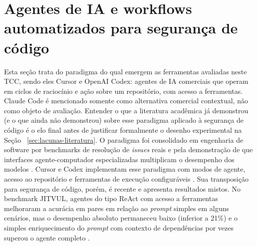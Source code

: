 \section{Agentes de IA e workflows automatizados para segurança de código}\label{sec:agentes-ia-seguranca}
Esta seção trata do paradigma do qual emergem as ferramentas avaliadas neste TCC, sendo eles Cursor e OpenAI Codex: agentes de IA comerciais que operam em ciclos de raciocínio e ação sobre um repositório, com acesso a ferramentas. Claude Code é mencionado somente como alternativa comercial contextual, não como objeto de avaliação. Entender o que a literatura acadêmica já demonstrou (e o que ainda não demonstrou) sobre esse paradigma aplicado à segurança de código é o elo final antes de justificar formalmente o desenho experimental na Seção ~\ref{sec:lacunas-literatura}. O paradigma foi consolidado em engenharia de software por benchmarks de resolução de \textit{issues} reais \cite{Jimenez2024SWEbench} e pela demonstração de que interfaces agente-computador especializadas multiplicam o desempenho dos modelos \cite{Yang2024SWEagent}. Cursor e Codex implementam esse paradigma com modos de agente, acesso ao repositório e ferramentas de execução configuráveis \cite{Cursor2025Docs, OpenAI2025CodexDocs}. Sua transposição para segurança de código, porém, é recente e apresenta resultados mistos. No benchmark JITVUL, agentes do tipo ReAct com acesso a ferramentas melhoraram a acurácia em pares em relação ao \textit{prompt} simples em alguns cenários, mas o desempenho absoluto permaneceu baixo (inferior a 21\%) e o simples enriquecimento do \textit{prompt} com contexto de dependências por vezes superou o agente completo \cite{Yildiz2025LLMAgents}.

